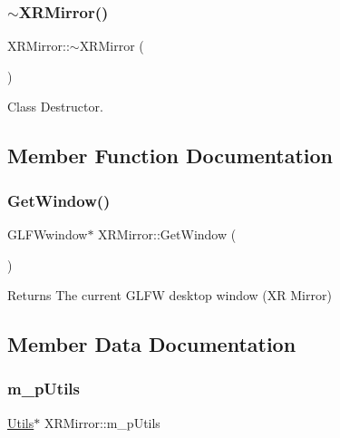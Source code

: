 \subsubsection{\texorpdfstring{$\sim$XRMirror()}{~XRMirror()}}
{\footnotesize\ttfamily X\+R\+Mirror\+::$\sim$\+X\+R\+Mirror (\begin{DoxyParamCaption}{ }\end{DoxyParamCaption})}



Class Destructor. 



\subsection{Member Function Documentation}
\mbox{\label{class_x_r_mirror_a966faccfee88f1f4ca2b8cfc881658c0}} 
\subsubsection{\texorpdfstring{GetWindow()}{GetWindow()}}
{\footnotesize\ttfamily G\+L\+F\+Wwindow$\ast$ X\+R\+Mirror\+::\+Get\+Window (\begin{DoxyParamCaption}{ }\end{DoxyParamCaption})\hspace{0.3cm}{\ttfamily [inline]}}

\begin{DoxyReturn}{Returns}
The current G\+L\+FW desktop window (XR Mirror) 
\end{DoxyReturn}


\subsection{Member Data Documentation}
\mbox{\label{class_x_r_mirror_aeb7f7a4cc3eb6fbe35d892876aac9fc0}} 
\subsubsection{\texorpdfstring{m\_pUtils}{m\_pUtils}}
{\footnotesize\ttfamily \mbox{\hyperlink{class_utils}{Utils}}$\ast$ X\+R\+Mirror\+::m\+\_\+p\+Utils\hspace{0.3cm}{\ttfamily [private]}}



